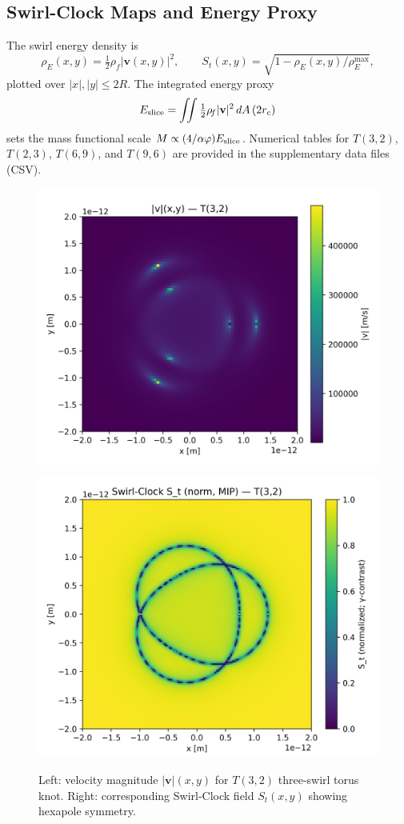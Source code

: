 \documentclass[10pt,reprint,aps,onecolumn,nofootinbib]{revtex4-2}
\begin{document}
    \subsection{Swirl-Clock Maps and Energy Proxy}
        The swirl energy density is
        \[
            \rho_{\!E}(x,y)=\tfrac12 \rho_{\!f}|\mathbf{v}(x,y)|^2,
            \qquad
            S_t(x,y)=\sqrt{1-\rho_{\!E}(x,y)/\rho_{\!E}^{\max}},
        \]
        plotted over $|x|,|y|\le 2R$. The integrated energy proxy
        \[
            E_{\rm slice}=\iint \tfrac12 \rho_{\!f}|\mathbf{v}|^2\,dA\,(2r_c)
        \]
        sets the mass functional scale $M\propto (4/\alpha\varphi) E_{\rm slice}$.
        Numerical tables for $T(3,2)$, $T(2,3)$, $T(6,9)$, and $T(9,6)$ are provided
        in the supplementary data files (CSV).

        \begin{figure}[h!]
        \centering
        \includegraphics[width=0.48\linewidth]{figures/T3_2_velmag_heatmap}\hfill
        \includegraphics[width=0.48\linewidth]{figures/T3_2_SwirlClock_norm_MIP}
        \caption{Left: velocity magnitude $|\mathbf{v}|(x,y)$ for $T(3,2)$ three-swirl torus knot.
        Right: corresponding Swirl-Clock field $S_t(x,y)$ showing hexapole symmetry.}
        \label{fig:hexapole}
        \end{figure}
\end{document}
